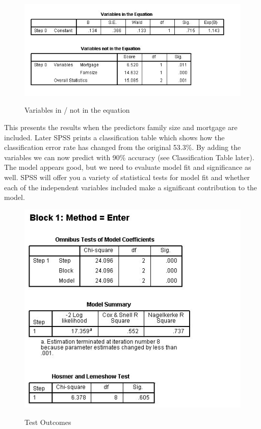 \documentclass[a4paper,12pt]{article}
\begin{document}
\begin{figure}
\begin{center}
  \includegraphics[scale=0.6]{images/Logistic4}\\
  \caption{Variables in / not in the equation}
\end{center}
\end{figure}
This presents the results when the predictors family size and
mortgage are included. Later SPSS prints a classification table which shows how the
classification error rate has changed from the original 53.3\%. By adding the variables
we can now predict with 90\% accuracy (see Classification Table later). The
model appears good, but we need to evaluate model fit and significance as well. SPSS will
offer you a variety of statistical tests for model fit and whether each of the independent
variables included make a significant contribution to the model.
\begin{figure}
\begin{center}
  \includegraphics[scale=0.6]{images/Logistic5}\\
  \caption{Test Outcomes}
\end{center}
\end{figure}
\end{document}
